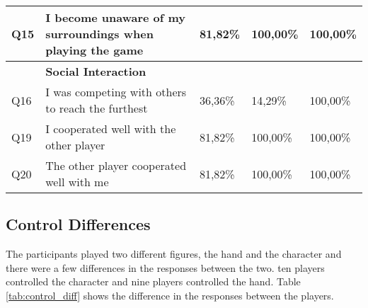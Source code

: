 \begin{table}[ht]
\begin{tabularx}{\textwidth}{|l|X|l|l|l|}
		Q15         & I become unaware of my surroundings when playing the game      & 81,82\%        & 100,00\%       & 100,00\%       \\ \hline
		& \textbf{Social Interaction}                                    &                &                &                \\ \hline
		Q16         & I was competing with others to reach the furthest              & 36,36\%        & 14,29\%        & 100,00\%       \\ \hline
		Q19         & I cooperated well with the other player                        & 81,82\%        & 100,00\%       & 100,00\%       \\ \hline
		Q20         & The other player cooperated well with me                       & 81,82\%        & 100,00\%       & 100,00\%       \\ \hline
	\end{tabularx}
\end{table}
\subsection{Control Differences}
The participants played two different figures, the hand and the character and there were a few differences in the responses between the two. ten players controlled the character and nine players controlled the hand. Table \ref{tab:control_diff} shows the difference in the responses between the players.


